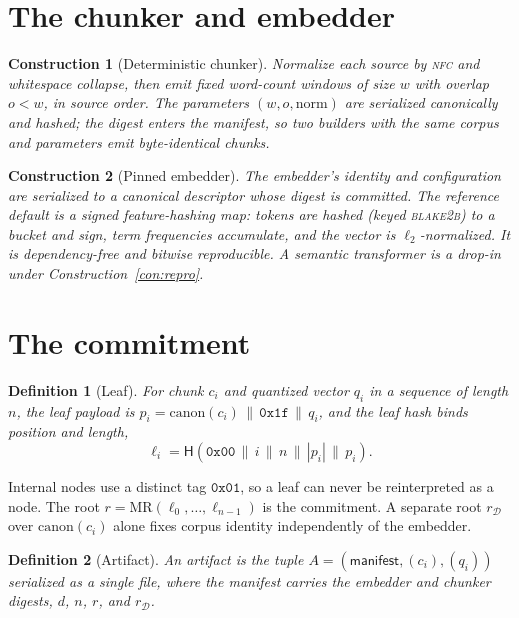 \documentclass[10pt,twocolumn]{article}
\newtheorem{construction}{Construction}
\newtheorem{definition}{Definition}
\theoremstyle{remark}
\begin{document}
\section{The chunker and embedder}
\begin{construction}[Deterministic chunker]
Normalize each source by \textsc{nfc} and whitespace collapse, then emit fixed
word-count windows of size $w$ with overlap $o<w$, in source order. The
parameters $(w,o,\text{norm})$ are serialized canonically and hashed; the digest
enters the manifest, so two builders with the same corpus and parameters emit
byte-identical chunks.
\end{construction}

\begin{construction}[Pinned embedder]
\label{con:embed}
The embedder's identity and configuration are serialized to a canonical
descriptor whose digest is committed. The reference default is a signed
feature-hashing map: tokens are hashed (keyed \textsc{blake2b}) to a bucket and
sign, term frequencies accumulate, and the vector is $\ell_2$-normalized. It is
dependency-free and bitwise reproducible. A semantic transformer is a drop-in
under Construction~\ref{con:repro}.
\end{construction}

\section{The commitment}
\begin{definition}[Leaf]
For chunk $c_i$ and quantized vector $q_i$ in a sequence of length $n$, the leaf
payload is $p_i = \mathrm{canon}(c_i)\,\|\,\texttt{0x1f}\,\|\,q_i$, and the leaf
hash binds position and length,
\[ \ell_i = \mathsf{H}\!\left(\texttt{0x00}\,\|\,i\,\|\,n\,\|\,|p_i|\,\|\,p_i\right). \]
\end{definition}
Internal nodes use a distinct tag $\texttt{0x01}$, so a leaf can never be
reinterpreted as a node. The root $r=\mathrm{MR}(\ell_0,\dots,\ell_{n-1})$ is the
commitment. A separate root $r_{\mathcal D}$ over $\mathrm{canon}(c_i)$ alone
fixes corpus identity independently of the embedder.

\begin{definition}[Artifact]
An artifact is the tuple $A=(\textsf{manifest}, (c_i), (q_i))$ serialized as a
single file, where the manifest carries the embedder and chunker digests, $d$,
$n$, $r$, and $r_{\mathcal D}$.
\end{definition}
\end{document}
